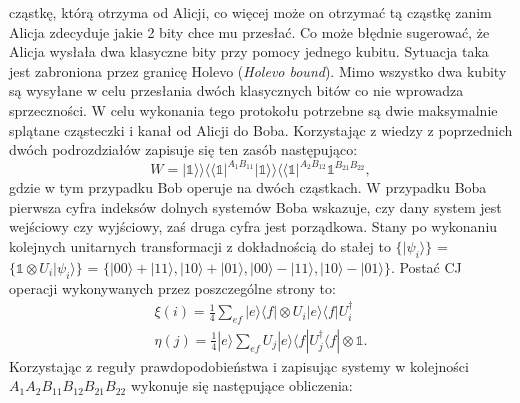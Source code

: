 \documentclass[10pt]{article} %
\newcommand{\Ket}[1]{|#1\rangle}
\newcommand{\Bra}[1]{\langle#1|}
\newcommand{\BBra}[1]{\langle\langle#1|}
\newcommand{\KKet}[1]{|#1\rangle\rangle}
\newcommand{\I}{\mathbb{1}}
\begin{document}
cząstkę, którą otrzyma od Alicji, co więcej może on otrzymać tą cząstkę zanim Alicja zdecyduje jakie 2 bity chce mu przesłać. Co może błędnie sugerować, że Alicja wysłała dwa klasyczne bity przy pomocy jednego kubitu. Sytuacja taka jest zabroniona przez granicę Holevo (\textit{Holevo bound}). Mimo wszystko dwa kubity są wysyłane w celu przesłania dwóch klasycznych bitów co nie wprowadza sprzeczności.
W celu wykonania tego protokołu potrzebne są dwie maksymalnie splątane cząsteczki i kanał od Alicji do Boba. Korzystając z wiedzy z poprzednich dwóch podrozdziałów zapisuje się ten zasób następująco:
\begin{equation}
W = \KKet{\I}\BBra{\I}^{A_1B_{11}}\KKet{\I}\BBra{\I}^{A_2B_{12}} \I^{B_{21}B_{22}},
\end{equation} gdzie w tym przypadku Bob operuje na dwóch cząstkach. W przypadku Boba pierwsza cyfra indeksów dolnych systemów Boba wskazuje, czy dany system jest wejściowy czy wyjściowy, zaś druga cyfra jest porządkowa.
Stany po wykonaniu kolejnych unitarnych transformacji z dokładnością do stałej to $\{ \Ket{\psi_i} \}$ = $\{\I \otimes U_i \Ket{\psi_i} \}$ = $\{ \Ket{00} + \Ket{11}, \Ket{10} + \Ket{01}, \Ket{00} - \Ket{11}, \Ket{10} - \Ket{01}\}$.
Postać CJ operacji wykonywanych przez poszczególne strony to:
\begin{gather}
\xi(i) = \frac{1}{4} \sum_{ef} \Ket{e}\Bra{f} \otimes U_i \Ket{e}\Bra{f} U_i^\dag  \\
\eta(j) = \frac{1}{4} \Ket{e}\sum_{ef} U_j \Ket{e}\Bra{f} U_j^\dag\Bra{f} \otimes \I.
\end{gather} Korzystając z reguły prawdopodobieństwa i zapisując systemy w kolejności $A_{1} A_2 B_{11} B_{12} B_{21} B_{22}$ wykonuje się następujące obliczenia:
\end{document}

